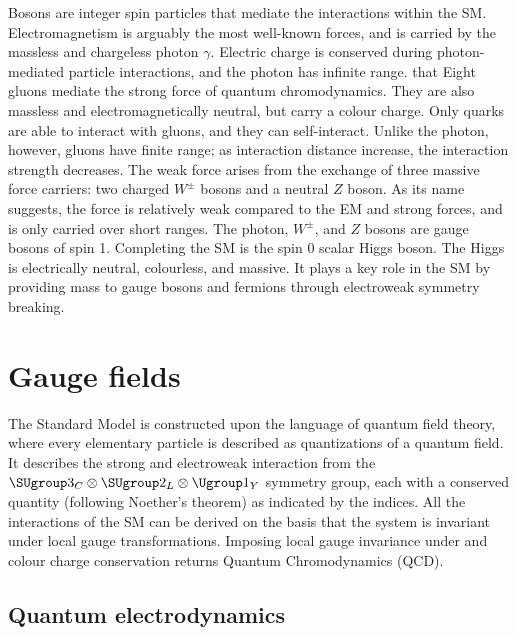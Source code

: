 Bosons are integer spin particles that mediate the interactions within the SM. Electromagnetism is arguably the most well-known forces, and is carried by the massless and chargeless photon $\gamma$. Electric charge is conserved during photon-mediated particle interactions, and the photon has infinite range. that Eight gluons mediate the strong force of quantum chromodynamics. They are also massless and electromagnetically neutral, but carry a colour charge. Only quarks are able to interact with gluons, and they can self-interact. Unlike the photon, however, gluons have finite range; as interaction distance increase, the interaction strength decreases. The weak force arises from the exchange of three massive force carriers: two charged $W^{\pm}$ bosons and a neutral $Z$ boson. As its name suggests, the force is relatively weak compared to the EM and strong forces, and is only carried over short ranges. The photon, $W^{\pm}$, and $Z$ bosons are gauge bosons of spin 1. Completing the SM is the spin 0 scalar Higgs boson. The Higgs is electrically neutral, colourless, and massive. It plays a key role in the SM by providing mass to gauge bosons and fermions through electroweak symmetry breaking.

%

\section{Gauge fields}

The Standard Model is constructed upon the language of quantum field theory, where every elementary particle is described as quantizations  of a quantum field. It describes the strong and electroweak interaction from the $\SUgroup3_C\otimes\SUgroup2_L\otimes\Ugroup1_Y$ symmetry group, each with a conserved quantity (following Noether's theorem) as indicated by the indices. All the interactions of the SM can be derived on the basis that the system is invariant under local gauge transformations. Imposing local gauge invariance under  and colour charge conservation returns Quantum Chromodynamics (QCD). 

\subsection{Quantum electrodynamics}
\label{ssec:QED}

